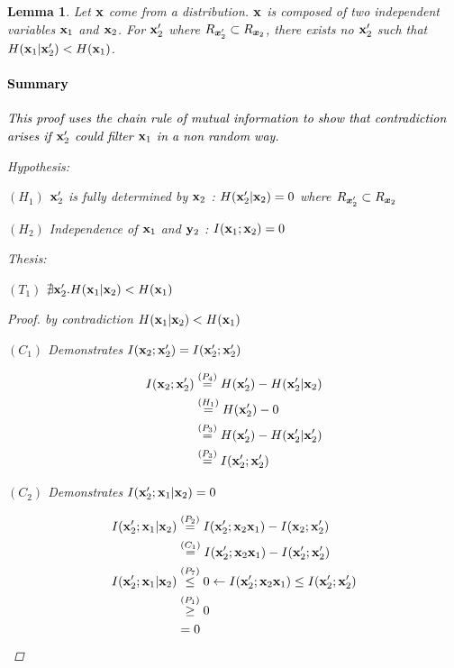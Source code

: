 \documentclass{article} %
\theoremstyle{plain}
\newtheorem{lemma}[theorem]{Lemma}
\theoremstyle{definition}
\theoremstyle{remark}
\begin{document}
\begin{lemma}

    Let ${\mathbf{x}}$ come from a distribution. ${\mathbf{x}}$ is composed of two independent variables ${\mathbf{x}}_1$ and ${\mathbf{x}}_2$. For ${\mathbf{x}}_2'$ where
    $R_{{\bm{x}}_2'} \subset R_{{\bm{x}}_2}$, there exists no ${\mathbf{x}}_2'$ such that $H({\mathbf{x}}_1|{\mathbf{x}}_2') < H({\mathbf{x}}_1)$.

\textcolor{black}{\paragraph{Summary} This proof uses the chain rule of mutual information to show that contradiction arises if ${\mathbf{x}}_2'$ could filter ${\mathbf{x}}_1$ in a non random way.}

Hypothesis:

$(H_1)$  ${\mathbf{x}}_2'$ is fully determined by ${\mathbf{x}}_2$ : $H({\mathbf{x}}_2'|{\mathbf{x}}_2) = 0$ where $R_{{\bm{x}}_2'} \subset R_{{\bm{x}}_2}$

$(H_2)$  Independence of ${\mathbf{x}}_1$ and ${\mathbf{y}}_2$ : $I({\mathbf{x}}_1;{\mathbf{x}}_2) = 0$

Thesis: 

$(T_1)$ $\nexists {\mathbf{x}}_2'.H({\mathbf{x}}_1|{\mathbf{x}}_2) < H({\mathbf{x}}_1)$

\begin{proof} by contradiction $H({\mathbf{x}}_1|{\mathbf{x}}_2) < H({\mathbf{x}}_1)$


    $(C_1)$ Demonstrates $I({\mathbf{x}}_2;{\mathbf{x}}_2') = I({\mathbf{x}}_2';{\mathbf{x}}_2')$

    $$
    \begin{aligned}
    I({\mathbf{x}}_2;{\mathbf{x}}_2') &\stackrel{\left(P_4\right)}{=} H({\mathbf{x}}_2') - H({\mathbf{x}}_2'|{\mathbf{x}}_2) \\
    &\stackrel{\left(H_1\right)}{=} H({\mathbf{x}}_2') - 0\\
    &\stackrel{\left(P_3\right)}{=} H({\mathbf{x}}_2') - H({\mathbf{x}}_2'|{\mathbf{x}}_2') \\
    &\stackrel{\left(P_3\right)}{=} I({\mathbf{x}}_2';{\mathbf{x}}_2')
    \end{aligned}
    $$

    $(C_2)$ Demonstrates  $I({\mathbf{x}}_2';{\mathbf{x}}_1|{\mathbf{x}}_2) = 0$
    
    $$
    \begin{aligned}
    I({\mathbf{x}}_2';{\mathbf{x}}_1|{\mathbf{x}}_2) &\stackrel{\left(P_2\right)}{=} I({\mathbf{x}}_2'; {\mathbf{x}}_2 {\mathbf{x}}_1) - I({\mathbf{x}}_2; {\mathbf{x}}_2') \\
    &\stackrel{\left(C_1\right)}{=} I({\mathbf{x}}_2';{\mathbf{x}}_2 {\mathbf{x}}_1) - I({\mathbf{x}}_2';{\mathbf{x}}_2') \\
    I({\mathbf{x}}_2';{\mathbf{x}}_1|{\mathbf{x}}_2)&\stackrel{\left(P_7\right)}{\leq} 0 \leftarrow I({\mathbf{x}}_2';{\mathbf{x}}_2 {\mathbf{x}}_1) \leq  I({\mathbf{x}}_2';{\mathbf{x}}_2') \\
    &\stackrel{\left(P_1\right)}{\geq} 0 \\
    &=0
    \end{aligned}
    $$


\end{proof}
\end{lemma}
\end{document}
